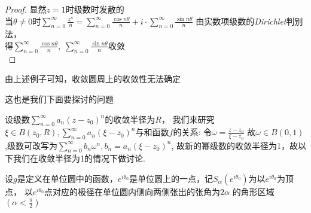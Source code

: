 \begin{proof}
    显然$z=1$时级数时发散的\\
    当$\theta\neq0$时$\displaystyle{\sum\limits_{n=0}^\infty\frac{z^n}{n}=
    \sum\limits_{n=0}^\infty\frac{\cos n\theta}{n}+i\cdot\sum\limits_{n=0}^\infty \frac{\sin n\theta}{n}}$
    由实数项级数的\emph{Dirichlet}判别法，\\
    得$\displaystyle{\sum\limits_{n=0}^\infty\frac{\cos n\theta}{n},\ \sum\limits_{n=0}^\infty \frac{\sin n\theta}{n}}$收敛\\
\end{proof}
由上述例子可知，收敛圆周上的收敛性无法确定\par 这也是我们下面要探讨的问题\par
设级数$\displaystyle{\sum\limits_{n=0}^\infty a_n(z-z_0)^n}$的收敛半径为$R$，
我们来研究$\displaystyle{\xi\in B(z_0,R),\sum\limits_{n=0}^\infty a_n(\xi-z_0)^n}$与和函数$f$的关系:
令$\displaystyle{\omega=\frac{z-z_0}{\xi-z_0}}$
故$\omega\in B(0,1)$,级数可改写为$\displaystyle{\sum\limits_{n=0}^\infty b_n\omega^n},b_n=a_n(\xi-z_0)^n$,
故新的幂级数的收敛半径为1，故以下我们在收敛半径为1的情况下做讨论.

\begin{theorem}[*]
    设$g$是定义在单位圆中的函数，$e^{i\theta_0}$是单位圆上的一点，记$S_\alpha(e^{i\theta_0})$为以$e^{i\theta_0}$为顶点，
    以$e^{i\theta_0}$点对应的极径在单位圆内侧向两侧张出的张角为$2\alpha$
    的角形区域$(\alpha<\frac{\pi}{2})$
\end{theorem}

